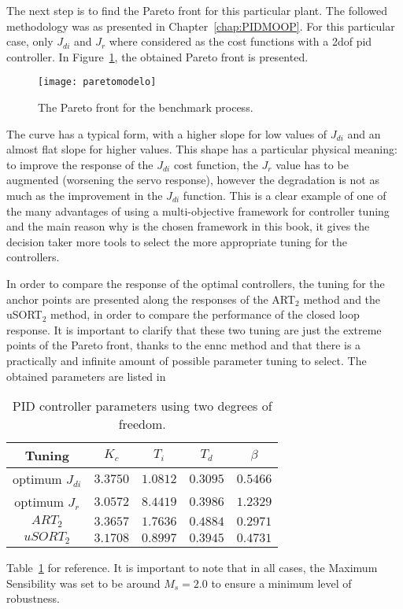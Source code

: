 The next step is to find the Pareto front for this particular plant. The followed methodology was as presented in Chapter~\ref{chap:PIDMOOP}. For this particular case, only $J_{di}$ and $J_r$ where considered as the cost functions with a \gls{2dof} \gls{pid} controller. In Figure~\ref{fig:paretomodelo}, the obtained Pareto front is presented. 
\begin{figure}[tb]%
	\centering
	\texttt{[image: paretomodelo]}%
	\caption{The Pareto front for the benchmark process.}%
	\label{fig:paretomodelo}%
\end{figure}

The curve has a typical form, with a higher slope for low values of $J_{di}$ and an almost flat slope for higher values. This shape has a particular physical meaning: to improve the response of the $J_{di}$ cost function, the $J_{r}$ value has to be augmented (worsening the servo response), however the degradation is not as much as the improvement in the $J_{di}$ function. This is a clear example of one of the many advantages of using a multi-objective framework for controller tuning and the main reason why is the chosen framework in this book, it gives the decision taker more tools to select the more appropriate tuning for the controllers.

In order to compare the response of the optimal controllers, the tuning for the anchor points are presented along the responses of the ART$_2$ method \citep{Vilanova2011} and the uSORT$_2$ method\citep{Alfaro2012a}, in order to compare the performance of the closed loop response. It is important to clarify that these two tuning are just the extreme points of the Pareto front, thanks to the \gls{ennc} method and that there is a practically and infinite amount of possible parameter tuning to select. The obtained parameters are listed in %
%
\begin{table}[tb]
	\caption{PID controller parameters using two degrees of freedom.}
	\centering
	\begin{tabular}{@{}*{5}{c}@{}}
		\toprule
		Tuning              &$K_c$       &$T_i$      &$T_d$     & $\beta$ 	\\
		\midrule              
		optimum $J_{di}$     &$3.3750$   & $1.0812$  &$0.3095$  &$0.5466$   \\
		optimum $J_{r}$      &$3.0572$   & $8.4419$  &$0.3986$  &$1.2329$   \\
		$ART_2$             &$3.3657$   & $1.7636$  &$0.4884$  &$0.2971$   \\
		$uSORT_2$           &$3.1708$   & $0.8997$  &$0.3945$  &$0.4731$   \\	
		\bottomrule				
	\end{tabular}
	\label{tab:parametroscontrolador}
\end{table}
%
Table~\ref{tab:parametroscontrolador} for reference. It is important to note that in all cases, the Maximum Sensibility was set to be around $M_s = 2.0$ to ensure a minimum level of robustness.

